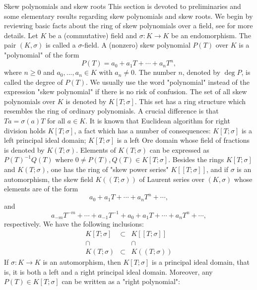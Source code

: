 \documentclass[11pt,a4paper]{article}
\theoremstyle{theorem}
\numberwithin{equation}{section}
\newcommand{\s}{\sigma}
\begin{document}


\begin{section}{Skew polynomials and skew roots}
	This section is devoted to  preliminaries and some elementary results regarding skew polynomials and skew roots.  We begin by reviewing basic facts about the ring of skew polynomials over a field, see \cite[Chapter 2]{cohn1995encyclopedia} for more details. Let $K$ be a (commutative) field and $\s:K\to K$ be an endomorphism. The pair $(K,\s)$ is called a $\s$-field. A (nonzero) skew polynomial $P(T)$ over $K$ is a "polynomial" of the form
	$$P(T)=a_0+a_1T+\cdots+a_n T^n,$$
	where $n\geq 0$ and $a_0,...,a_n\in K$ with $a_n\neq 0$. The number $n$, denoted by  $\deg P$, is called the degree of $P(T)$. We usually use the word "polynomial" instead of the expression "skew polynomial"  if there is no risk of confusion. The set of all skew polynomials over $K$ is denoted by $K[T;\sigma]$. This set has a ring structure which resembles the ring of ordinary polynomials. A crucial difference is that $Ta=\s(a)T$ for all $a\in K$. It is known that Euclidean algorithm for right division holds $K[T;\sigma]$, a fact which has a number of consequences: $K[T;\sigma]$ is a left principal ideal domain; $K[T;\sigma]$ is a left Ore domain whose field of fractions is denoted by    $K(T;\sigma)$. Elements of $K(T;\sigma)$ can be expressed as $P(T)^{-1}Q(T)$ where $0\neq P(T), Q(T)\in K[T;\sigma]$. Besides the rings $K[T;\sigma]$ and $K(T;\sigma)$, one has the ring of "skew power series" $K[[T;\sigma]]$, and if $\s$ is an automorphism, the skew field $K((T;\sigma))$ of Laurent series over $(K,\s)$  whose elements are of the form 
	$$a_0+a_1T+\cdots+a_n T^n+\cdots,
	$$
	and 
	$$a_{-m}T^{-m}+\cdots+a_{-1}T^{-1}+a_0+a_1T+\cdots+a_n T^n+\cdots,
	$$
	respectively. We  have the following inclusions: 
	$$
	\begin{matrix}
		K[T;\sigma] & \subset & K[[T;\sigma]]\\
		\cap & & \cap\\
		K(T;\sigma)  & \subset & K((T;\sigma))
	\end{matrix}
	$$
	If $\s:K\to K$ is an automorphism, then $K[T;\sigma]$ is a principal ideal domain, that is, it is both a left and a right principal ideal domain. Moreover, any $P(T)\in K[T;\sigma]$  can be written as a "right polynomial":

\end{section}
\end{document}
